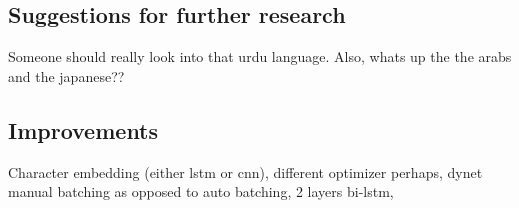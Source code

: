 \subsection{Suggestions for further research}

Someone should really look into that urdu language. Also, whats up the the arabs
and the japanese??

\subsection{Improvements}

Character embedding (either lstm or cnn), different optimizer perhaps, dynet manual batching as
opposed to auto batching, 2 layers bi-lstm, 

\pagebreak
